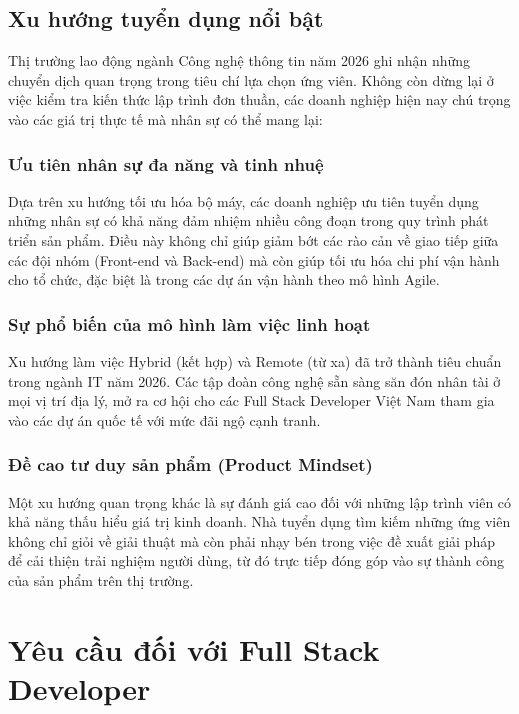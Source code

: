 \documentclass[12pt,a4paper]{article}
\begin{document}
\subsection{Xu hướng tuyển dụng nổi bật}

\hspace{0.7cm}Thị trường lao động ngành Công nghệ thông tin năm 2026 ghi nhận những chuyển dịch quan trọng trong tiêu chí lựa chọn ứng viên. Không còn dừng lại ở việc kiểm tra kiến thức lập trình đơn thuần, các doanh nghiệp hiện nay chú trọng vào các giá trị thực tế mà nhân sự có thể mang lại:

\subsubsection{Ưu tiên nhân sự đa năng và tinh nhuệ}
\hspace{0.7cm}Dựa trên xu hướng tối ưu hóa bộ máy, các doanh nghiệp ưu tiên tuyển dụng những nhân sự có khả năng đảm nhiệm nhiều công đoạn trong quy trình phát triển sản phẩm. Điều này không chỉ giúp giảm bớt các rào cản về giao tiếp giữa các đội nhóm (Front-end và Back-end) mà còn giúp tối ưu hóa chi phí vận hành cho tổ chức, đặc biệt là trong các dự án vận hành theo mô hình Agile.
\subsubsection{Sự phổ biến của mô hình làm việc linh hoạt}
\hspace{0.7cm}Xu hướng làm việc Hybrid (kết hợp) và Remote (từ xa) đã trở thành tiêu chuẩn trong ngành IT năm 2026. Các tập đoàn công nghệ sẵn sàng săn đón nhân tài ở mọi vị trí địa lý, mở ra cơ hội cho các Full Stack Developer Việt Nam tham gia vào các dự án quốc tế với mức đãi ngộ cạnh tranh.
\subsubsection{Đề cao tư duy sản phẩm (Product Mindset)}
\hspace{0.7cm}Một xu hướng quan trọng khác là sự đánh giá cao đối với những lập trình viên có khả năng thấu hiểu giá trị kinh doanh. Nhà tuyển dụng tìm kiếm những ứng viên không chỉ giỏi về giải thuật mà còn phải nhạy bén trong việc đề xuất giải pháp để cải thiện trải nghiệm người dùng, từ đó trực tiếp đóng góp vào sự thành công của sản phẩm trên thị trường.

\section{Yêu cầu đối với Full Stack Developer}
\end{document}
